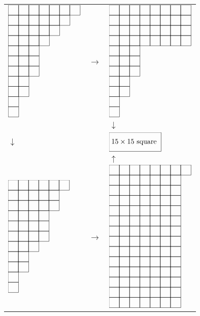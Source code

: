 \documentclass{tac}
\begin{document}
{      \begin{tabular}{lll}
      $\xymatrix@W=.7pc @H=.7pc @R=0pc @C=0pc @*[F-]{~&~&~&~&~&~&~\\~&~&~&~&~&~\\~&~&~&~&~\\~&~&~&~\\~&~&~\\~&~&~\\~&~&~\\~&~\\~&~\\~\\~}$&$\to$&$\xymatrix@W=.7pc @H=.7pc @R=0pc @C=0pc @*[F-]{~&~&~&~&~&~&~&~\\~&~&~&~&~&~&~&~\\~&~&~&~&~&~&~&~\\~&~&~&~&~&~&~&~\\~&~&~\\~&~&~\\~&~&~\\~&~\\~&~\\~\\~}$ \\
      &&$\downarrow$\\
      $\downarrow$&&$\xymatrix@W=1.7pc @H=1.7pc @R=0pc @C=0pc @*[F-]{15\times 15 \text{ square }}$\\
      &&$\uparrow$\\
      $\xymatrix@W=.7pc @H=.7pc @R=0pc @C=0pc @*[F-]{~&~&~&~&~&~\\~&~&~&~&~\\~&~&~&~&~\\~&~&~&~\\~&~&~&~\\~&~&~&~\\~&~&~\\~&~\\~&~\\~\\~}$&$\to$&$\xymatrix@W=.7pc @H=.7pc @R=0pc @C=0pc @*[F-]{~&~&~&~&~&~&~&~\\~&~&~&~&~&~&~\\~&~&~&~&~&~&~\\~&~&~&~&~&~&~\\~&~&~&~&~&~&~\\~&~&~&~&~&~&~\\~&~&~&~&~&~&~\\~&~&~&~&~&~&~\\~&~&~&~&~&~&~\\~&~&~&~&~&~&~\\~&~&~&~&~&~&~\\~&~&~&~&~&~&~\\~&~&~&~&~&~&~\\~&~&~&~&~&~&~}$\\
      \end{tabular}

}
\end{document}
